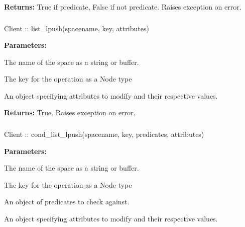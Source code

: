\noindent\textbf{Returns:}
True if predicate, False if not predicate.  Raises exception on error.

\subsubsection{}
\label{api:nodejs:list_lpush}
\begin{javascriptcode}
Client :: list_lpush(spacename, key, attributes)
\end{javascriptcode}


\noindent\textbf{Parameters:}
\begin{description}[labelindent=\widthof{{\code{attributes}}},leftmargin=*,noitemsep,nolistsep,align=right]
\item[\code{spacename}] The name of the space as a string or buffer.
\item[\code{key}] The key for the operation as a Node type
\item[\code{attributes}] An object specifying attributes to modify and their respective values.
\end{description}

\noindent\textbf{Returns:}
True.  Raises exception on error.

\subsubsection{}
\label{api:nodejs:cond_list_lpush}
\begin{javascriptcode}
Client :: cond_list_lpush(spacename, key, predicates, attributes)
\end{javascriptcode}


\noindent\textbf{Parameters:}
\begin{description}[labelindent=\widthof{{\code{predicates}}},leftmargin=*,noitemsep,nolistsep,align=right]
\item[\code{spacename}] The name of the space as a string or buffer.
\item[\code{key}] The key for the operation as a Node type
\item[\code{predicates}] An object of predicates to check against.
\item[\code{attributes}] An object specifying attributes to modify and their respective values.
\end{description}

